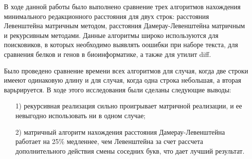 \newpage
{}

В ходе данной работы было выполнено сравнение трех алгоритмов нахождения минимального редакционного расстояния для двух строк: расстояния Левенштейна матричным методом, расстояния Дамерау-Левенштейна матричным и рекурсивным методами. Данные алгоритмы широко используются для поисковиков, в которых необходимо выявлять оошибки при наборе текста, для сравнения белков и генов в биоинформатике, а также для утилит diff.

Было проведено сравнение времени всех алгоритмов для случая, когда две строки имееют одинаковую длину и для случая, когда одна строка небольшая, а вторая варьрируется. В ходе этого исследования были сделаны следующие выводы:

\begin{enumerate}
    \item[1)] рекурсивная реализация сильно проигрывает матричной реализации, и ее невыгодно использовать ни в одном случае;
    \item[2)] матричный алгоритм нахождения расстояния Дамерау-Левенштейна работает на 25\% медленнее, чем Левенштейна за счет рассчета дополнительного действия смены соседних букв, что дает лучший результат.
\end{enumerate}
